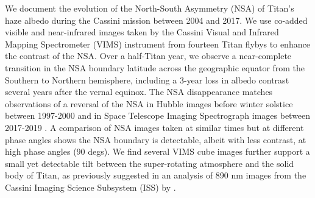 \documentclass[12pt]{article}
\begin{document}
\maketitle
\vspace{-1\baselineskip}

We document the evolution of the North-South Asymmetry (NSA) of Titan's haze albedo during the Cassini mission between 2004 and 2017. We use co-added visible and near-infrared images taken by the Cassini Visual and Infrared Mapping Spectrometer (VIMS) instrument from fourteen Titan flybys to enhance the contrast of the NSA. Over a half-Titan year, we observe a near-complete transition in the NSA boundary latitude across the geographic equator from the Southern to Northern hemisphere, including a 3-year loss in albedo contrast several years after the vernal equinox. The NSA disappearance matches observations of a reversal of the NSA in Hubble images before winter solstice between 1997-2000 \citep{lorenz2001titan} and in Space Telescope Imaging Spectrograph images between 2017-2019 \citep{karkoschka2022titan}. A comparison of NSA images taken at similar times but at different phase angles shows the NSA boundary is detectable, albeit with less contrast, at high phase angles (\raisebox{-0.5ex}{\textasciitilde}90 degs). We find several VIMS cube images further support a small yet detectable tilt between the super-rotating atmosphere and the solid body of Titan, as previously suggested in an analysis of 890 nm images from the Cassini Imaging Science Subsystem (ISS) by \cite{roman2009}.

\end{document}
